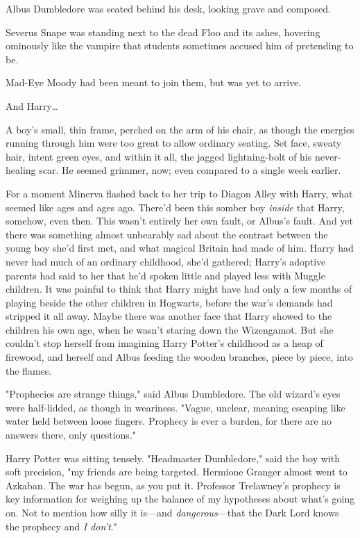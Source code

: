 Albus Dumbledore was seated behind his desk, looking grave and composed.

Severus Snape was standing next to the dead Floo and its ashes, hovering ominously like the vampire that students sometimes accused him of pretending to be.

Mad-Eye Moody had been meant to join them, but was yet to arrive.

And Harry{\ldots}

A boy's small, thin frame, perched on the arm of his chair, as though the energies running through him were too great to allow ordinary seating. Set face, sweaty hair, intent green eyes, and within it all, the jagged lightning-bolt of his never-healing scar. He seemed grimmer, now; even compared to a single week earlier.

For a moment Minerva flashed back to her trip to Diagon Alley with Harry, what seemed like ages and ages ago. There'd been this somber boy \emph{inside} that Harry, somehow, even then. This wasn't entirely her own fault, or Albus's fault. And yet there was something almost unbearably sad about the contrast between the young boy she'd first met, and what magical Britain had made of him. Harry had never had much of an ordinary childhood, she'd gathered; Harry's adoptive parents had said to her that he'd spoken little and played less with Muggle children. It was painful to think that Harry might have had only a few months of playing beside the other children in Hogwarts, before the war's demands had stripped it all away. Maybe there was another face that Harry showed to the children his own age, when he wasn't staring down the Wizengamot. But she couldn't stop herself from imagining Harry Potter's childhood as a heap of firewood, and herself and Albus feeding the wooden branches, piece by piece, into the flames.

"Prophecies are strange things," said Albus Dumbledore. The old wizard's eyes were half-lidded, as though in weariness. "Vague, unclear, meaning escaping like water held between loose fingers. Prophecy is ever a burden, for there are no answers there, only questions."

Harry Potter was sitting tensely. "Headmaster Dumbledore," said the boy with soft precision, "my friends are being targeted. Hermione Granger almost went to Azkaban. The war has begun, as you put it. Professor Trelawney's prophecy is key information for weighing up the balance of my hypotheses about what's going on. Not to mention how silly it is---and \emph{dangerous}---that the Dark Lord knows the prophecy and \emph{I don't}."

